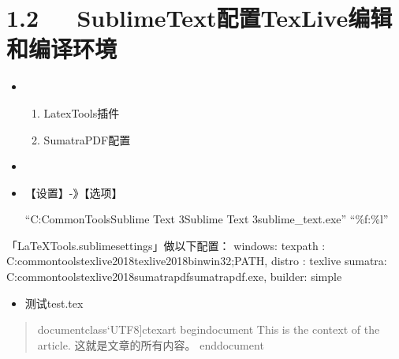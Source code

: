 \documentclass[letterpaper,12pt,english]{sphinxmanual}
\begin{document}
\section{1.2   SublimeText配置TexLive编辑和编译环境}
\label{\detokenize{001software/001install/LaTex:sublimetexttexlive}}\begin{itemize}
\item {} 
\begin{enumerate}
%
\item {} 
LatexTools插件

\item {} 
SumatraPDF配置

\end{enumerate}

\item {} 

\item {} 
【设置】-》【选项】

“C:CommonToolsSublime Text 3Sublime Text 3sublime\_text.exe” “\%f:\%l”

\end{itemize}

\begin{sphinxVerbatim}[commandchars=\\\{\}]
「LaTeXTools.sublime\PYGZhy{}settings」做以下配置：
\PYGZdq{}windows\PYGZdq{}:\PYGZob{}
    \PYGZdq{}texpath\PYGZdq{} : \PYGZdq{}C:\PYGZbs{}\PYGZbs{}commontools\PYGZbs{}\PYGZbs{}texlive2018\PYGZbs{}\PYGZbs{}texlive\PYGZbs{}\PYGZbs{}2018\PYGZbs{}\PYGZbs{}bin\PYGZbs{}\PYGZbs{}win32;\PYGZdl{}PATH\PYGZdq{},
\PYGZdq{}distro\PYGZdq{} : \PYGZdq{}texlive\PYGZdq{}
\PYGZdq{}sumatra\PYGZdq{}: \PYGZdq{}C:\PYGZbs{}\PYGZbs{}commontools\PYGZbs{}\PYGZbs{}texlive2018\PYGZbs{}\PYGZbs{}sumatrapdf\PYGZbs{}\PYGZbs{}sumatrapdf.exe\PYGZdq{},
\PYGZcb{}
    \PYGZdq{}builder\PYGZdq{}: \PYGZdq{}simple\PYGZdq{}
\PYGZcb{}
\end{sphinxVerbatim}
\begin{itemize}
\item {} 
测试test.tex

\end{itemize}
\begin{quote}

\begin{sphinxVerbatim}[commandchars=\\\{\}]
\PYGZbs{}documentclass{}`UTF8]\PYGZob{}ctexart\PYGZcb{}
\PYGZbs{}begin\PYGZob{}document\PYGZcb{}
This is the context of the article.
这就是文章的所有内容。
\PYGZbs{}end\PYGZob{}document\PYGZcb{}
\end{sphinxVerbatim}
\end{quote}
\end{document}
